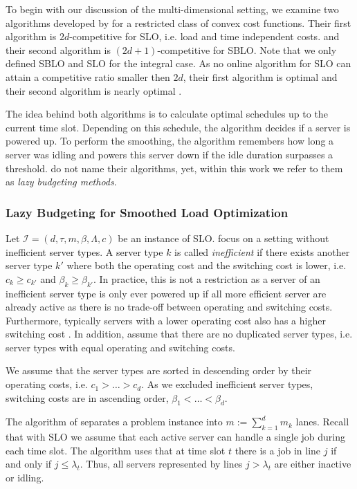 To begin with our discussion of the multi-dimensional setting, we examine two algorithms developed by \citeauthor*{Albers2021} for a restricted class of convex cost functions. Their first algorithm is $2d$-competitive for SLO, i.e. load and time independent costs. and their second algorithm is $(2d+1)$-competitive for SBLO. Note that we only defined SBLO and SLO for the integral case. As no online algorithm for SLO can attain a competitive ratio smaller then $2d$, their first algorithm is optimal and their second algorithm is nearly optimal \cite{Albers2021, Albers2021_2}.

The idea behind both algorithms is to calculate optimal schedules up to the current time slot. Depending on this schedule, the algorithm decides if a server is powered up. To perform the smoothing, the algorithm remembers how long a server was idling and powers this server down if the idle duration surpasses a threshold. \citeauthor*{Albers2021} do not name their algorithms, yet, within this work we refer to them as \emph{lazy budgeting methods}.

\subsubsection{Lazy Budgeting for Smoothed Load Optimization}

Let $\mathcal{I} = (d, \tau, m, \beta, \Lambda, c)$ be an instance of SLO. \citeauthor*{Albers2021} focus on a setting without inefficient server types. A server type $k$ is called \emph{inefficient} if there exists another server type $k'$ where both the operating cost and the switching cost is lower, i.e. $c_k \geq c_{k'}$ and $\beta_k \geq \beta_{k'}$. In practice, this is not a restriction as a server of an inefficient server type is only ever powered up if all more efficient server are already active as there is no trade-off between operating and switching costs. Furthermore, typically servers with a lower operating cost also has a higher switching cost \cite{Albers2021}. In addition, \citeauthor*{Albers2021} assume that there are no duplicated server types, i.e. server types with equal operating and switching costs.

We assume that the server types are sorted in descending order by their operating costs, i.e. $c_1 > \dots > c_d$. As we excluded inefficient server types, switching costs are in ascending order, $\beta_1 < \dots < \beta_d$.

The algorithm of \citeauthor*{Albers2021} separates a problem instance into $m := \sum_{k=1}^d m_k$ lanes. Recall that with SLO we assume that each active server can handle a single job during each time slot. The algorithm uses that at time slot $t$ there is a job in line $j$ if and only if $j \leq \lambda_{t}$. Thus, all servers represented by lines $j > \lambda_{t}$ are either inactive or idling.

